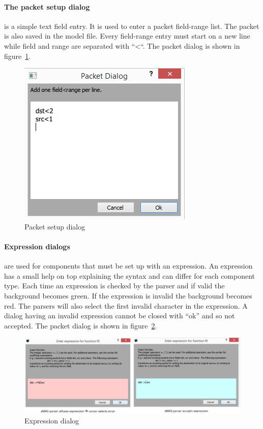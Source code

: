 \paragraph{The packet setup dialog} is a simple text field entry. It is used to
enter a packet field-range list. The packet is also saved in the model file.
Every field-range entry must start on a new line while field and range are separated with ``\textless ``.
The packet dialog is shown in figure~\ref{fig:packet-setup}.
   
\begin{figure}[here]
\begin{center}	
	\includegraphics[width=.30\linewidth]{pictures/packet-setup}
	\caption{Packet setup dialog}
	\label{fig:packet-setup}
\end{center}
\end{figure}

\paragraph{Expression dialogs} are used for components that must be set up with
an expression. An expression has a small help on top explaining the syntax and
can differ for each component type. Each time an expression is checked by the
parser and if valid the background becomes green. If the expression is invalid
the background becomes red. The parsers will also select the first invalid
character in the expression. A dialog having an invalid expression cannot be
closed with ``ok'' and so not accepted. The packet dialog is shown
in figure~\ref{fig:expression-dialog}.

\begin{figure}[here]
\begin{center}	
	\includegraphics[width=.90\linewidth]{pictures/expression-dialog}
	\caption{Expression dialog}
	\label{fig:expression-dialog}
\end{center}
\end{figure}



